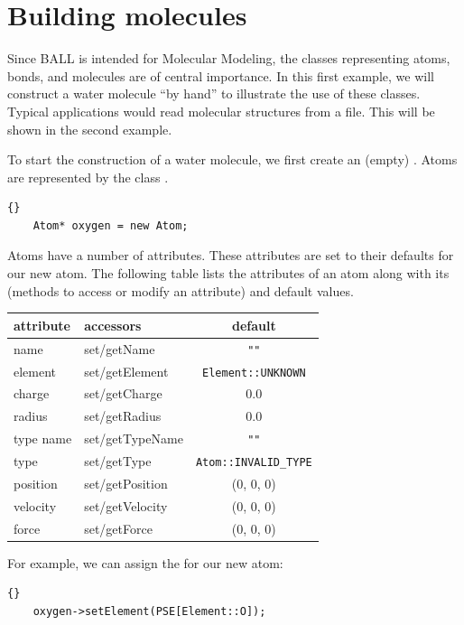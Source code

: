 \section{Building molecules}

Since BALL is intended for Molecular Modeling, the classes representing atoms,
bonds, and molecules are of central importance. In this first example, we will
construct a water molecule ``by hand'' to illustrate the use of these classes.
Typical applications would read molecular structures from a file. This will be
shown in the second example.

\noindent
To start the construction of a water molecule, we first create an (empty)
. Atoms are represented by the class .

\begin{lstlisting}{}
	Atom* oxygen = new Atom;
\end{lstlisting}
	
\noindent
Atoms have a number of attributes. These attributes are set to their defaults
for our new atom. The following table lists the attributes of an atom along
with its  (methods to access or modify an attribute) and
default values.
\begin{center}
	\begin{tabular}{llc}
	attribute		&	accessors     		& default\\
	\hline
	name				& set/getName				& {\tt ""}\\
	element			& set/getElement    & {\tt Element::UNKNOWN}\\
	charge			& set/getCharge			& 0.0\\
	radius			& set/getRadius			& 0.0\\
	type name   & set/getTypeName   & {\tt ""}\\
	type        & set/getType       & {\tt Atom::INVALID\_TYPE}\\
	position    & set/getPosition   & (0, 0, 0)\\
	velocity    & set/getVelocity   & (0, 0, 0)\\
	force		    & set/getForce		  & (0, 0, 0)
	\end{tabular}
\end{center}

\noindent
For example, we can assign the  for our new atom:

\begin{lstlisting}{}
	oxygen->setElement(PSE[Element::O]);
\end{lstlisting}


